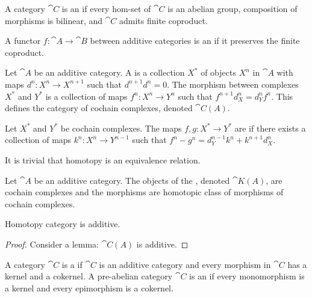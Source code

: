 \begin{definition}
    A category $\cat{C}$ is an  if every hom-set of $\cat{C}$ is an abelian group, composition of morphisms is bilinear, and $\cat{C}$ admits finite coproduct.
\end{definition}
\begin{definition}
    A functor $f:\cat{A}\to\cat{B}$ between additive categories is an  if it preserves the finite coproduct.
\end{definition}
\begin{definition}
    Let $\cat{A}$ be an additive category. A  is a collection ${X}^{*}$ of objects ${X}^{n}$ in $\cat{A}$ with maps ${d}^{n}:{X}^{n}\to{X}^{n+1}$ such that ${d}^{n+1}{d}^{n}=0$. The morphism between complexes ${X}^{*}$ and ${Y}^{*}$ is a collection of maps ${f}^{n}:{X}^{n}\to{Y}^{n}$ such that ${f}^{n+1}{d}_{X}^{n}={d}_{Y}^{n}{f}^{n}$. This defines the category of cochain complexes, denoted $\cat{C(A)}$.
\end{definition}
\begin{definition}
    Let ${X}^{*}$ and ${Y}^{*}$ be cochain complexes. The maps $f,g:{X}^{*}\to{Y}^{*}$ are  if there exists a collection of maps ${k}^{n}:{X}^{n}\to{Y}^{n-1}$ such that ${f}^{n}-{g}^{n}={d}_{Y}^{n-1}{k}^{n}+{k}^{n+1}{d}_{X}^{n}$.
\end{definition}
\par
It is trivial that homotopy is an equivalence relation.
\begin{definition}
    Let $\cat{A}$ be an additive category. The objects of the , denoted $\cat{K(A)}$, are cochain complexes and the morphisms are homotopic class of morphisms of cochain complexes.
\end{definition}
\begin{proposition}
    Homotopy category is additive.
\end{proposition}
\begin{proof}
    Consider a lemma: $\cat{C(A)}$ is additive. 
\end{proof}
\begin{definition}
    A category $\cat{C}$ is a  if $\cat{C}$ is an additive category and every morphism in $\cat{C}$ has a kernel and a cokernel. A pre-abelian category $\cat{C}$ is an  if every monomorphism is a kernel and every epimorphism is a cokernel.
\end{definition}
